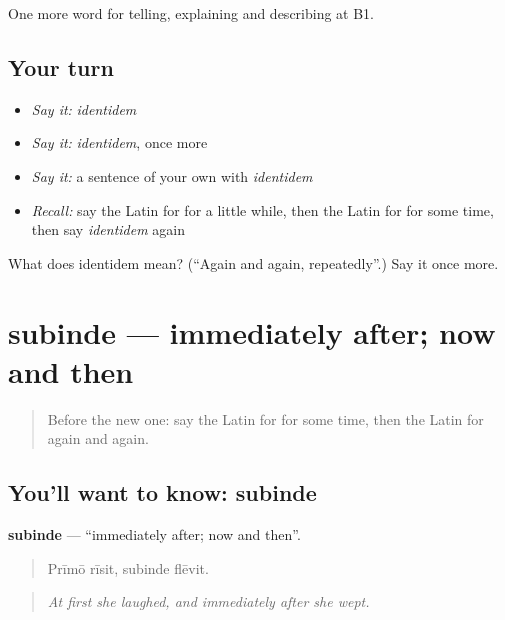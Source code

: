 \begin{grammarlens}[title={What you've built}]
One more word for telling, explaining and describing at B1.
\end{grammarlens}

\subsection*{Your turn}
\begin{itemize}
\raggedright
  \item \emph{Say it:} \emph{identidem}
  \item \emph{Say it:} \emph{identidem}, once more
  \item \emph{Say it:} a sentence of your own with \emph{identidem}
  \item \emph{Recall:} say the Latin for for a little while, then the Latin for for some time, then say \emph{identidem} again
\end{itemize}

\begin{tcolorbox}[breakable,colback=teal!4,colframe=teal!35!black,title={Before you move on}]
What does identidem mean? (\textquotedblleft{}Again and again, repeatedly\textquotedblright{}.) Say it once more.
\end{tcolorbox}
\section[subinde]{subinde — immediately after; now and then}

\label{lesson:LA-C294-subinde}



\begin{quote}
Before the new one: say the Latin for for some time, then the Latin for again and again.
\end{quote}

\subsection*{You'll want to know: subinde}
\textbf{subinde} — \textquotedblleft{}immediately after; now and then\textquotedblright{}.

\begin{quote}
Prīmō rīsit, subinde flēvit.
\end{quote}

\begin{quote}
\emph{At first she laughed, and immediately after she wept.}
\end{quote}

